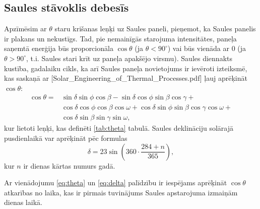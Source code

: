 
\subsection{Saules stāvoklis debesīs}
Apzīmēsim ar $\theta$ staru krišanas leņķi uz Saules paneli, pieņemot, ka Saules panelis ir plakans un nekustīgs. Tad, pie nemainīgās starojuma intensitātes, paneļa saņemtā enerģija būs proporcionāla $\cos{\theta}$ (ja $\theta<90^\circ$) vai būs vienāda ar 0 (ja $\theta>90^\circ$, t.i. Saules stari krīt uz paneļa apakšējo virsmu). Saules diennakts kustība, gadalaiku cikls, ka arī Saules paneļa novietojums ir ievēroti izteiksmē, kas saskaņā ar [Solar\_Engineering\_of\_Thermal\_Processes.pdf] ļauj aprēķināt $\cos{\theta}$:
\begin{equation}
\label{eq:theta}
\begin{aligned}
	\cos{\theta} = {} & \sin{\delta} \sin{\phi} \cos{\beta} - \sin{\delta} \cos{\phi} \sin{\beta} \cos{\gamma} +                           \\
	                  & \cos{\delta} \cos{\phi} \cos{\beta} \cos{\omega} + \cos{\delta} \sin{\phi} \sin{\beta} \cos{\gamma} \cos{\omega} + \\
	                  & \cos{\delta} \sin{\beta} \sin{\gamma} \sin{\omega},
\end{aligned}
\end{equation}
kur lietoti leņķi, kas definēti \ref{tab:theta} tabulā. Saules deklināciju solārajā pusdienlaikā var aprēķināt pēc formulas
\begin{equation}
\label{eq:delta}
    \delta = 23 \sin \left( 360 \cdot \frac{284+n}{365} \right),
\end{equation}
kur $n$ ir dienas kārtas numurs gadā.

Ar vienādojumu \ref{eq:theta} un \ref{eq:delta} palīdzību ir iespējams aprēķināt $\cos{\theta}$ atkarības no laika, kas ir pirmais tuvinājums Saules apstarojuma izmaiņām dienas laikā.

